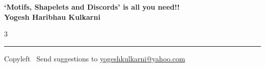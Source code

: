 \documentclass[8pt,landscape]{article}
\begin{document}
\footnotesize


\begin{center}
\Large{\textbf{`Motifs, Shapelets and Discords' is all you need!!\\ Yogesh Haribhau Kulkarni}}
\end{center}

\begin{multicols}{3}

\end{multicols}

\rule{\linewidth}{0.25pt}
\scriptsize
Copyleft \textcopyleft\  Send suggestions to
\href{http://www.yogeshkulkarni.com}{yogeshkulkarni@yahoo.com}
\end{document}

